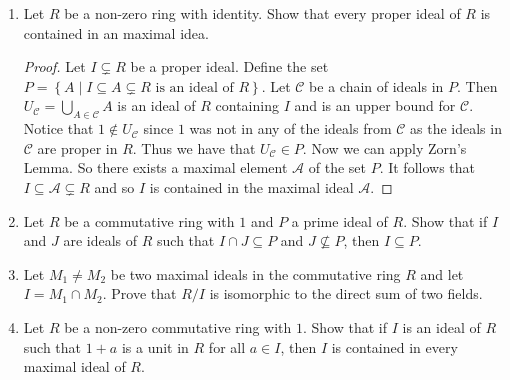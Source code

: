 \documentclass{article}
\theoremstyle{definition}
\newcommand{\Z}{\mathbb{Z}}
\newcommand{\set}[1]{\left\{#1\right\}}
\begin{document}
\begin{enumerate}
            \begin{proof}
                For (a) since $M$ is a maximal ideal then $R/M$ is a field and thus an integral domain. Since $R/M$ is an integral domain, then $M$ is a prime ideal of $R$.

                For (b) note that $\Z[x]/(x) \equiv \Z$ so $(x)$ is a prime ideal of $\Z[x]$ but $(x)$ is not maximal in $\Z[x]$ since $\Z$ is not a field.
            \end{proof}
            
            \item Let $R$ be a non-zero ring with identity. Show that every proper ideal of $R$ is contained in an maximal idea. 
            
            \begin{proof}
                Let $I \subsetneq R$ be a proper ideal. Define the set $P=\set{A \mid I \subseteq A\subsetneq R \text{ is an ideal of }R}$. Let $\mathcal{C}$ be a chain of ideals in $P$. Then $U_\mathcal{C}=\bigcup _{A\in \mathcal{C}}A$ is an ideal of $R$ containing $I$ and is an upper bound for $\mathcal{C}$. Notice that $1\notin U_\mathcal{C}$ since $1$ was not in any of the ideals from $\mathcal{C}$ as the ideals in $\mathcal{C}$ are proper in $R$. Thus we have that $U_\mathcal{C}\in P$. Now we can apply Zorn's Lemma. So there exists a maximal element $\mathscr{A}$ of the set $P$. It follows that $I\subseteq \mathscr{A}\subsetneq R$ and so $I$ is contained in the maximal ideal $\mathscr{A}$.
                
            \end{proof}
            
            \item Let $R$ be a commutative ring with $1$ and $P$ a prime ideal of $R$. Show that if $I$ and $J$ are ideals of $R$ such that $I\cap J \subseteq P$ and $J\nsubseteq P$, then $I\subseteq P$.
            
            \item Let $M_1 \neq M_2$ be two maximal ideals in the commutative ring $R$ and let $I=M_1\cap M_2$. Prove that $R/I$ is isomorphic to the direct sum of two fields. 
            

            \item Let $R$ be a non-zero commutative ring with $1$. Show that if $I$ is an ideal of $R$ such that $1+a$ is a unit in $R$ for all $a\in I$, then $I$ is contained in every maximal ideal of $R$.
            

\end{enumerate}
\end{document}
